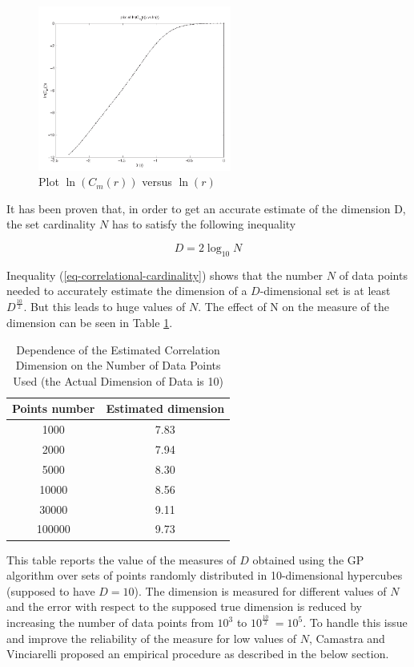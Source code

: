 \documentclass[journal]{IEEEtran}
\begin{document}
\begin{figure}[!t]
  \centering
  \includegraphics[width=2.5in]{fig-3.png}
  \caption{Plot \(\ln(C_m(r))\) versus \(\ln(r)\)}
  \label{fig_plot_correlation}
\end{figure}

It has been proven \cite{Eckmann92, Smith88} that, in order to get an accurate 
estimate of the dimension D, the set cardinality \(N\) has to satisfy the following inequality

\begin{equation}
  \label{eq-correlational-cardinality}
  D = 2\log_{10}N
\end{equation}

Inequality (\ref{eq-correlational-cardinality}) shows that the number \(N\) of data points needed to 
accurately estimate the dimension of a \(D\)-dimensional set is at least \(D^{\frac{10}{2}}\).
But this leads to huge values of \(N\).
The effect of N on the measure of the dimension can be seen in
Table \ref{tbl_effect_of_n}.

\begin{table}[!t]
  \renewcommand{\arraystretch}{2.5}
  \caption{Dependence of the Estimated Correlation Dimension on the Number of Data Points Used (the Actual Dimension of Data is 10)}
  \label{tbl_effect_of_n}
  \centering
  \begin{tabular}{c||c}
  \hline
  \bfseries Points number & \bfseries Estimated dimension\\
  \hline\hline
  1000 & 7.83\\
  2000 & 7.94\\
  5000 & 8.30\\
  10000 & 8.56\\
  30000 & 9.11\\
  100000 & 9.73\\
  \hline
  \end{tabular}
\end{table}
  

This table reports the value of the measures of \(D\) obtained using the GP algorithm over sets of points randomly distributed in
10-dimensional hypercubes (supposed to have \(D = 10\)). The dimension is measured for different values of \(N\) and the error 
with respect to the supposed true dimension is reduced by increasing the number of data points from \(10^3\) to \(10^\frac{10}{2}\ = 10^5\).
To handle this issue and improve the reliability of the measure for low values of \(N\), Camastra and Vinciarelli proposed an empirical procedure 
as described in the below section.
\end{document}
